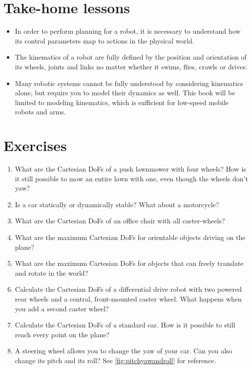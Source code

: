 


\section*{Take-home lessons}

\begin{itemize}
\item In order to perform planning for a robot, it is necessary to understand how its control parameters map to actions in the physical world.
\item The kinematics of a robot are fully defined by the position and orientation of its wheels, joints and links no matter whether it swims, flies, crawls or drives.
\item Many robotic systems cannot be fully understood by considering kinematics alone, but require you to model their dynamics as well. This book will be limited to modeling kinematics, which is sufficient for low-speed mobile robots and arms.
\end{itemize}


\section*{Exercises}\small
\begin{enumerate}
\item What are the Cartesian DoFs of a push lawnmower with four wheels? How is it still possible to mow an entire lawn with one, even though the wheels don't yaw?
\item Is a car statically or dynamically stable? What about a motorcycle?
\item What are the Cartesian DoFs of an office chair with all caster-wheels?
\item What are the maximum Cartesian DoFs for orientable objects driving on the plane?
\item What are the maximum Cartesian DoFs for objects that can freely translate and rotate in the world?
\item Calculate the Cartesian DoFs of a differential drive robot with two powered rear wheels and a central, front-mounted caster wheel. What happens when you add a second caster wheel?
\item Calculate the Cartesian DoFs of a standard car. How is it possible to still reach every point on the plane?
\item A steering wheel allows you to change the yaw of your car. Can you also change its pitch and its roll? See \cref{fig:pitchyawandroll} for reference.
\end{enumerate}\normalsize
